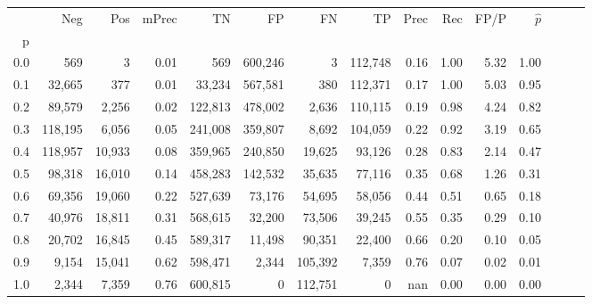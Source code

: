 \begin{tabular}{rrrrrrrrrrrrrrr}
\toprule
{} &      Neg &     Pos & mPrec &       TN &       FP &       FN &       TP &  Prec &   Rec &  FP/P & $\hat{p}$ \\
p   &          &         &       &          &          &          &          &       &       &       &           \\
\midrule
0.0 &      569 &       3 &  0.01 &      569 &  600,246 &        3 &  112,748 &  0.16 &  1.00 &  5.32 &      1.00 \\
0.1 &   32,665 &     377 &  0.01 &   33,234 &  567,581 &      380 &  112,371 &  0.17 &  1.00 &  5.03 &      0.95 \\
0.2 &   89,579 &   2,256 &  0.02 &  122,813 &  478,002 &    2,636 &  110,115 &  0.19 &  0.98 &  4.24 &      0.82 \\
0.3 &  118,195 &   6,056 &  0.05 &  241,008 &  359,807 &    8,692 &  104,059 &  0.22 &  0.92 &  3.19 &      0.65 \\
0.4 &  118,957 &  10,933 &  0.08 &  359,965 &  240,850 &   19,625 &   93,126 &  0.28 &  0.83 &  2.14 &      0.47 \\
0.5 &   98,318 &  16,010 &  0.14 &  458,283 &  142,532 &   35,635 &   77,116 &  0.35 &  0.68 &  1.26 &      0.31 \\
0.6 &   69,356 &  19,060 &  0.22 &  527,639 &   73,176 &   54,695 &   58,056 &  0.44 &  0.51 &  0.65 &      0.18 \\
0.7 &   40,976 &  18,811 &  0.31 &  568,615 &   32,200 &   73,506 &   39,245 &  0.55 &  0.35 &  0.29 &      0.10 \\
0.8 &   20,702 &  16,845 &  0.45 &  589,317 &   11,498 &   90,351 &   22,400 &  0.66 &  0.20 &  0.10 &      0.05 \\
0.9 &    9,154 &  15,041 &  0.62 &  598,471 &    2,344 &  105,392 &    7,359 &  0.76 &  0.07 &  0.02 &      0.01 \\
1.0 &    2,344 &   7,359 &  0.76 &  600,815 &        0 &  112,751 &        0 &   nan &  0.00 &  0.00 &      0.00 \\
\bottomrule
\end{tabular}
